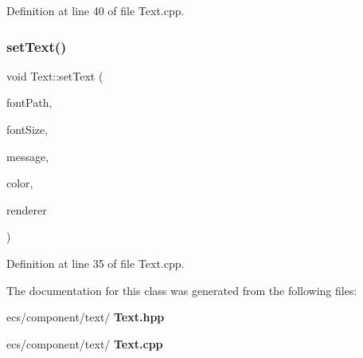 Definition at line 40 of file Text.\+cpp.

\mbox{\label{class_text_a2bd6e34581aa2e7a64da31c23d63a797}} 
\subsubsection{set\+Text()}
{\footnotesize\ttfamily void Text\+::set\+Text (\begin{DoxyParamCaption}\item[{const std\+::string \&}]{font\+Path,  }\item[{int}]{font\+Size,  }\item[{const std\+::string \&}]{message,  }\item[{const S\+D\+L\+\_\+\+Color \&}]{color,  }\item[{S\+D\+L\+\_\+\+Renderer $\ast$}]{renderer }\end{DoxyParamCaption})}



Definition at line 35 of file Text.\+cpp.



The documentation for this class was generated from the following files\+:\begin{DoxyCompactItemize}
\item 
ecs/component/text/\textbf{ Text.\+hpp}\item 
ecs/component/text/\textbf{ Text.\+cpp}\end{DoxyCompactItemize}
